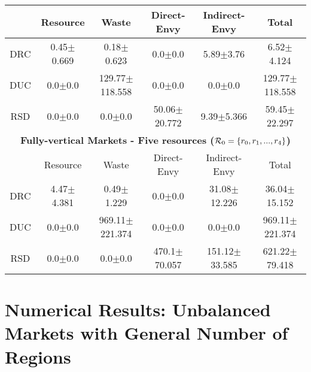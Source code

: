 \begin{table}[ht]
{\begin{tabular}{cccccc}
\toprule
& Resource   & Waste   & Direct-Envy   & Indirect-Envy    & Total       \\
\hline
DRC & 0.45$\pm$0.669  & 0.18$\pm$0.623     & 0.0$\pm$0.0       & 5.89$\pm$3.76  & 6.52$\pm$4.124     \\
DUC & 0.0$\pm$0.0     & 129.77$\pm$118.558 & 0.0$\pm$0.0       & 0.0$\pm$0.0    & 129.77$\pm$118.558 \\
RSD & 0.0$\pm$0.0     & 0.0$\pm$0.0        & 50.06$\pm$20.772  & 9.39$\pm$5.366 & 59.45$\pm$22.297   \\
\toprule
\multicolumn{6}{c}{\textbf{Fully-vertical Markets - Five resources ($\operatorname{{\color{black}\mathcal{R}}}_0 = \{r_0,r_1,...,r_4\}$)}}\\
\toprule
& Resource   & Waste   & Direct-Envy   & Indirect-Envy    & Total       \\
\hline
DRC & 4.47$\pm$4.381  & 0.49$\pm$1.229     & 0.0$\pm$0.0       & 31.08$\pm$12.226  & 36.04$\pm$15.152   \\
DUC & 0.0$\pm$0.0     & 969.11$\pm$221.374 & 0.0$\pm$0.0       & 0.0$\pm$0.0       & 969.11$\pm$221.374 \\
RSD & 0.0$\pm$0.0     & 0.0$\pm$0.0        & 470.1$\pm$70.057  & 151.12$\pm$33.585 & 621.22$\pm$79.418  \\
\toprule
\end{tabular}
\label{tab:blocking_contracts_five_resources}
}
\end{table}

\section{Numerical Results: Unbalanced Markets with General Number of Regions}\label{Appendix:Unbalanced markets}

